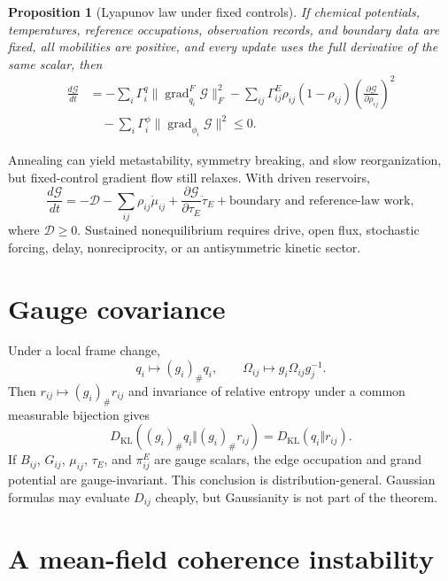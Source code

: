 \documentclass[11pt,letterpaper]{article}
\newcommand{\KL}{D_{\mathrm{KL}}}
\newcommand{\cG}{\mathcal G}
\newcommand{\push}{_{\#}}
\newcommand{\grad}{\operatorname{grad}}
\newtheorem{proposition}{Proposition}
\begin{document}
\begin{proposition}[Lyapunov law under fixed controls]
If chemical potentials, temperatures, reference occupations, observation records, and boundary data are fixed, all mobilities are positive, and every update uses the full derivative of the same scalar, then
\begin{align}
 \frac{d\cG}{dt}
 &=-\sum_i\Gamma_i^q\lVert\grad_{q_i}^{F}\cG\rVert_F^2
 -\sum_{ij}\Gamma_{ij}^{E}\rho_{ij}(1-\rho_{ij})
 \left(\frac{\partial\cG}{\partial\rho_{ij}}\right)^2
 \nonumber\\
 &\quad-\sum_i\Gamma_i^{\phi}\lVert\grad_{\phi_i}\cG\rVert^2
 \leq0.
 \label{eq:lyapunov-law}
\end{align}
\end{proposition}

Annealing can yield metastability, symmetry breaking, and slow reorganization, but fixed-control gradient flow still relaxes.  With driven reservoirs,
\begin{equation}
 \frac{d\cG}{dt}
 =-\mathcal D-\sum_{ij}\rho_{ij}\dot\mu_{ij}
 +\frac{\partial\cG}{\partial\tau_E}\dot\tau_E
 +\text{boundary and reference-law work},
 \label{eq:driven-balance}
\end{equation}
where $\mathcal D\geq0$.  Sustained nonequilibrium requires drive, open flux, stochastic forcing, delay, nonreciprocity, or an antisymmetric kinetic sector.

\section{Gauge covariance}

Under a local frame change,
\begin{equation}
 q_i\mapsto(g_i)\push q_i,
 \qquad
 \Omega_{ij}\mapsto g_i\Omega_{ij}g_j^{-1}.
 \label{eq:gauge-action}
\end{equation}
Then $r_{ij}\mapsto(g_i)\push r_{ij}$ and invariance of relative entropy under a common measurable bijection gives
\begin{equation}
 \KL\left((g_i)\push q_i\Vert(g_i)\push r_{ij}\right)
 =\KL(q_i\Vert r_{ij}).
 \label{eq:gauge-kl-invariance}
\end{equation}
If $B_{ij}$, $G_{ij}$, $\mu_{ij}$, $\tau_E$, and $\pi_{ij}^{E}$ are gauge scalars, the edge occupation and grand potential are gauge-invariant.  This conclusion is distribution-general.  Gaussian formulas may evaluate $D_{ij}$ cheaply, but Gaussianity is not part of the theorem.

\section{A mean-field coherence instability}
\end{document}
